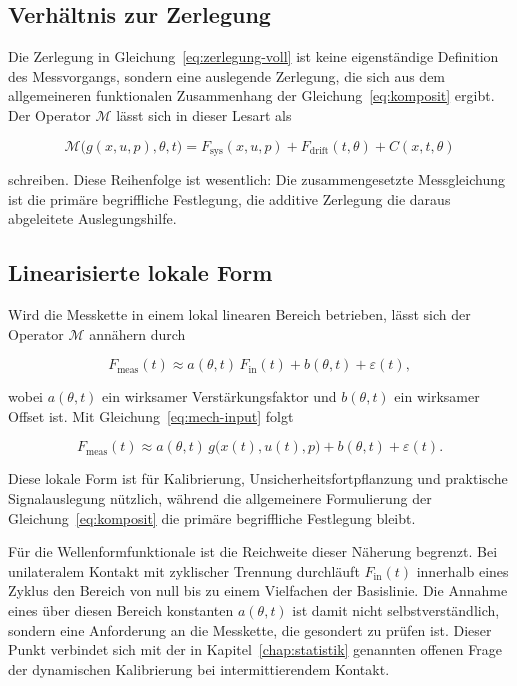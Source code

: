 \documentclass[12pt,a4paper]{report}
\begin{document}
\subsection{Verhältnis zur Zerlegung}

Die Zerlegung in Gleichung~\eqref{eq:zerlegung-voll} ist keine
eigenständige Definition des Messvorgangs, sondern eine auslegende
Zerlegung, die sich aus dem allgemeineren funktionalen Zusammenhang der
Gleichung~\eqref{eq:komposit} ergibt. Der Operator $\mathcal{M}$ lässt
sich in dieser Lesart als

\[
\mathcal{M}\bigl(g(x,u,p), \theta, t\bigr)
= F_{\mathrm{sys}}(x,u,p) + F_{\mathrm{drift}}(t,\theta) + C(x,t,\theta)
\]

schreiben. Diese Reihenfolge ist wesentlich: Die zusammengesetzte
Messgleichung ist die primäre begriffliche Festlegung, die additive
Zerlegung die daraus abgeleitete Auslegungshilfe.

\subsection{Linearisierte lokale Form}

Wird die Messkette in einem lokal linearen Bereich betrieben, lässt sich
der Operator $\mathcal{M}$ annähern durch

\begin{equation}
F_{\mathrm{meas}}(t) \approx a(\theta,t)\, F_{\mathrm{in}}(t) + b(\theta,t) + \varepsilon(t),
\label{eq:linear}
\end{equation}

wobei $a(\theta,t)$ ein wirksamer Verstärkungsfaktor und $b(\theta,t)$
ein wirksamer Offset ist. Mit Gleichung~\eqref{eq:mech-input} folgt

\begin{equation}
F_{\mathrm{meas}}(t) \approx a(\theta,t)\, g\bigl(x(t),u(t),p\bigr) + b(\theta,t) + \varepsilon(t).
\label{eq:linear-g}
\end{equation}

Diese lokale Form ist für Kalibrierung, Unsicherheitsfortpflanzung und
praktische Signalauslegung nützlich, während die allgemeinere
Formulierung der Gleichung~\eqref{eq:komposit} die primäre begriffliche
Festlegung bleibt.

Für die Wellenformfunktionale ist die Reichweite dieser Näherung
begrenzt. Bei unilateralem Kontakt mit zyklischer Trennung durchläuft
$F_{\mathrm{in}}(t)$ innerhalb eines Zyklus den Bereich von null bis zu
einem Vielfachen der Basislinie. Die Annahme eines über diesen Bereich
konstanten $a(\theta,t)$ ist damit nicht selbstverständlich, sondern eine
Anforderung an die Messkette, die gesondert zu prüfen ist. Dieser Punkt
verbindet sich mit der in Kapitel~\ref{chap:statistik} genannten offenen
Frage der dynamischen Kalibrierung bei intermittierendem Kontakt.
\end{document}
